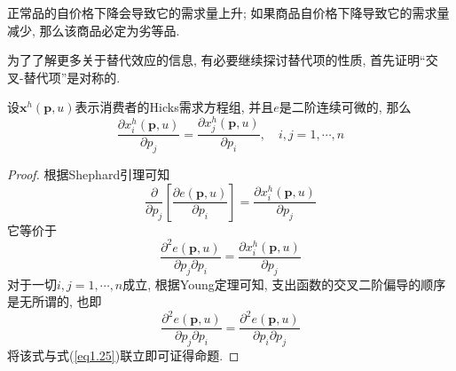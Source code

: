 \documentclass[cn, 12pt, math=mtpro2, bibstyle=apa, blue]{elegantbook}
\newcommand{\p}{\mathbf{p}}
\newcommand{\x}{\mathbf{x}}
\begin{document}
\begin{corollary}
正常品的自价格下降会导致它的需求量上升; 如果商品自价格下降导致它的需求量减少, 那么该商品必定为劣等品.
\end{corollary}

为了了解更多关于替代效应的信息, 有必要继续探讨替代项的性质, 首先证明“交叉-替代项”是对称的.

\begin{proposition}\label{pro:pro1.3}
设$\x^h(\p,u)$表示消费者的Hicks需求方程组, 并且$e$是二阶连续可微的, 那么
$$\frac{\partial x_i^h(\p,u)}{\partial p_j}=\frac{\partial x_j^h(\p,u)}{\partial p_i},\quad i,j=1,\cdots,n$$
\end{proposition}
\begin{proof}
  根据Shephard引理可知
  $$\frac{\partial}{\partial p_j}\left[\frac{\partial e(\p,u)}{\partial p_i}\right]=\frac{\partial x_i^h(\p,u)}{\partial p_j}$$
  它等价于
  \begin{equation}\label{eq1.25}
    \frac{\partial^2e(\p,u)}{\partial p_j\partial p_i}=\frac{\partial x_i^h(\p,u)}{\partial p_j}
  \end{equation}
  对于一切$i,j=1,\cdots,n$成立, 根据Young定理可知, 支出函数的交叉二阶偏导的顺序是无所谓的, 也即
  $$\frac{\partial^2e(\p,u)}{\partial p_j\partial p_i}=\frac{\partial^2e(\p,u)}{\partial p_i\partial p_j}$$
  将该式与式(\ref{eq1.25})联立即可证得命题.
\end{proof}
\end{document}
